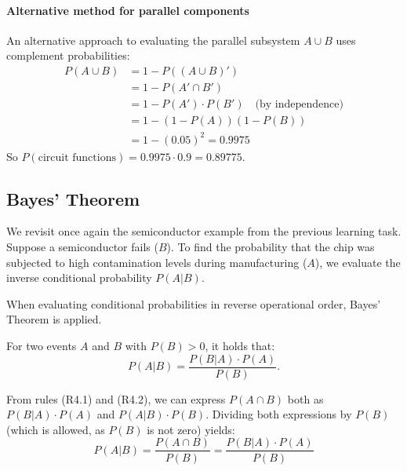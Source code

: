 \paragraph{Alternative method for parallel components}
An alternative approach to evaluating the parallel subsystem $A \cup B$ uses complement probabilities:
\begin{align*}
    P(A \cup B) &= 1 - P((A \cup B)') \\
    &= 1 - P(A' \cap B') \\
    &= 1 - P(A') \cdot P(B') \quad \text{(by independence)} \\
    &= 1 - (1 - P(A))(1 - P(B)) \\
    &= 1 - (0.05)^2 = 0.9975
\end{align*}
So $P(\text{circuit functions}) = 0.9975 \cdot 0.9 = \mathbf{0.89775}$.


\subsection*{Bayes' Theorem}

We revisit once again the semiconductor example from the previous learning task.
Suppose a semiconductor fails ($B$).
To find the probability that the chip was subjected to high contamination levels during manufacturing ($A$),
we evaluate the inverse conditional probability $P(A|B)$.

When evaluating conditional probabilities in reverse operational order, Bayes' Theorem is applied.

\begin{theorem}
    For two events $A$ and $B$ with $P(B) > 0$, it holds that:
    \[
        P(A|B) = \frac{P(B|A) \cdot P(A)}{P(B)}.
    \]
\end{theorem}
\begin{proofbox}
    From rules (R4.1) and (R4.2), we can express $P(A \cap B)$ both as $P(B|A)\cdot P(A)$ and $P(A|B) \cdot P(B)$. 
    Dividing both expressions by $P(B)$ (which is allowed, as $P(B)$ is not zero) yields:
    \[
        P(A|B) = \frac{P(A \cap B)}{P(B)} = \frac{P(B|A) \cdot P(A)}{P(B)}
    \]
\end{proofbox}

\begin{center}
    \label{fig:bayes-theorem-partition}
\end{center}


